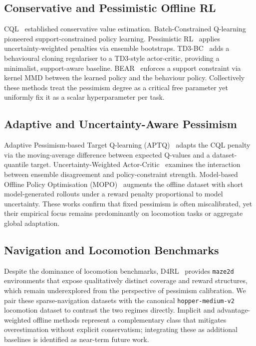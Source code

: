 \documentclass[conference]{IEEEtran}
\begin{document}
\subsection{Conservative and Pessimistic Offline RL}

CQL~\cite{kumar2020conservative} established conservative value estimation.
Batch-Constrained Q-learning~\cite{fujimoto2019bcq} pioneered
support-constrained policy learning. Pessimistic
RL~\cite{an2021pbrl} applies uncertainty-weighted penalties via
ensemble bootstraps. TD3-BC~\cite{fujimoto2021td3bc} adds a behavioural
cloning regulariser to a TD3-style actor-critic, providing a minimalist,
support-aware baseline. BEAR~\cite{kumar2019bear} enforces a support
constraint via kernel MMD between the learned policy and the behaviour
policy. Collectively these methods treat the pessimism degree as a critical
free parameter yet uniformly fix it as a scalar hyperparameter per task.

\subsection{Adaptive and Uncertainty-Aware Pessimism}

Adaptive Pessimism-based Target Q-learning
(APTQ)~\cite{liu2023aptq} adapts the CQL penalty via the moving-average
difference between expected Q-values and a dataset-quantile target.
Uncertainty-Weighted Actor-Critic~\cite{wu2021uncertainty} examines the
interaction between ensemble disagreement and policy-constraint strength.
Model-based Offline Policy Optimisation
(MOPO)~\cite{yu2020mopo} augments the offline dataset with short
model-generated rollouts under a reward penalty proportional to model
uncertainty. These works confirm that fixed pessimism is often
miscalibrated, yet their empirical focus remains predominantly on locomotion
tasks or aggregate global adaptation.

\subsection{Navigation and Locomotion Benchmarks}

Despite the dominance of locomotion benchmarks,
D4RL~\cite{fu2020d4rl} provides \texttt{maze2d} environments that expose
qualitatively distinct coverage and reward structures, which remain
underexplored from the perspective of pessimism calibration. We pair these
sparse-navigation datasets with the canonical \texttt{hopper-medium-v2}
locomotion dataset to contrast the two regimes directly. Implicit and
advantage-weighted offline methods represent a complementary class that
mitigates overestimation without explicit conservatism; integrating these as
additional baselines is identified as near-term future work.
\end{document}
